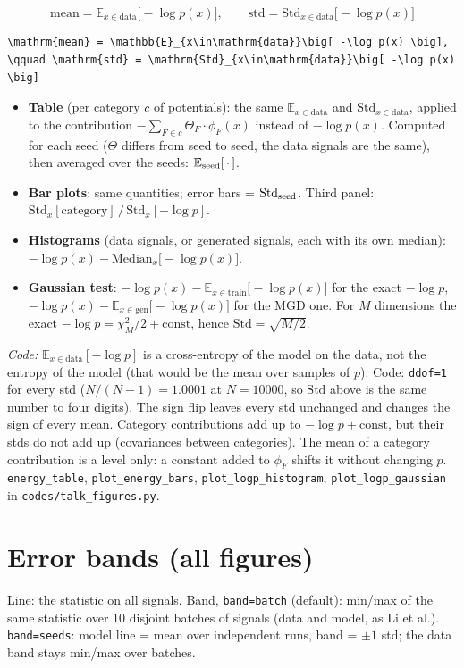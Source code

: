 \documentclass[11pt]{article}
\newcommand{\codenote}[1]{{\small\color{notegray}\emph{Code:} #1\par}}
\begin{document}
\[
\mathrm{mean} = \mathbb{E}_{x\in\mathrm{data}}\big[ -\log p(x) \big], \qquad \mathrm{std} = \mathrm{Std}_{x\in\mathrm{data}}\big[ -\log p(x) \big]
\]
\begin{lstlisting}
\mathrm{mean} = \mathbb{E}_{x\in\mathrm{data}}\big[ -\log p(x) \big], \qquad \mathrm{std} = \mathrm{Std}_{x\in\mathrm{data}}\big[ -\log p(x) \big]
\end{lstlisting}
\begin{itemize}
\item \textbf{Table} (per category $c$ of potentials): the same $\mathbb{E}_{x\in\mathrm{data}}$ and $\mathrm{Std}_{x\in\mathrm{data}}$, applied to the contribution $-\sum_{F \in c} \Theta_F \cdot \phi_F(x)$ instead of $-\log p(x)$. Computed for each seed ($\Theta$ differs from seed to seed, the data signals are the same), then averaged over the seeds: $\mathbb{E}_{\rm seed}[\,\cdot\,]$.
\item \textbf{Bar plots}: same quantities; error bars = $\mathrm{Std}_{\rm seed}$. Third panel: $\mathrm{Std}_{x}[\text{category}] \,/\, \mathrm{Std}_{x}[-\log p]$.
\item \textbf{Histograms} (data signals, or generated signals, each with its own median): $-\log p(x) - \mathrm{Median}_{x}\big[-\log p(x)\big]$.
\item \textbf{Gaussian test}: $-\log p(x) - \mathbb{E}_{x\in\mathrm{train}}\big[-\log p(x)\big]$ for the exact $-\log p$, $-\log p(x) - \mathbb{E}_{x\in\mathrm{gen}}\big[-\log p(x)\big]$ for the MGD one. For $M$ dimensions the exact $-\log p = \chi^2_M/2 + \mathrm{const}$, hence $\mathrm{Std} = \sqrt{M/2}$.
\end{itemize}

\codenote{$\mathbb{E}_{x\in\mathrm{data}}[-\log p]$ is a cross-entropy of the model on the data, not the entropy of the model (that would be the mean over samples of $p$). Code: \texttt{ddof=1} for every std ($N/(N-1) = 1.0001$ at $N = 10000$, so $\mathrm{Std}$ above is the same number to four digits). The sign flip leaves every std unchanged and changes the sign of every mean. Category contributions add up to $-\log p + \mathrm{const}$, but their stds do not add up (covariances between categories). The mean of a category contribution is a level only: a constant added to $\phi_F$ shifts it without changing $p$. \texttt{energy\_table}, \texttt{plot\_energy\_bars}, \texttt{plot\_logp\_histogram}, \texttt{plot\_logp\_gaussian} in \texttt{codes/talk\_figures.py}.}
\section{Error bands (all figures)}
Line: the statistic on all signals. Band, \texttt{band=\textquotesingle batch\textquotesingle} (default): min/max of the same statistic over 10 disjoint batches of signals (data and model, as Li et al.). \texttt{band=\textquotesingle seeds\textquotesingle}: model line = mean over independent runs, band = $\pm 1$ std; the data band stays min/max over batches.
\end{document}
